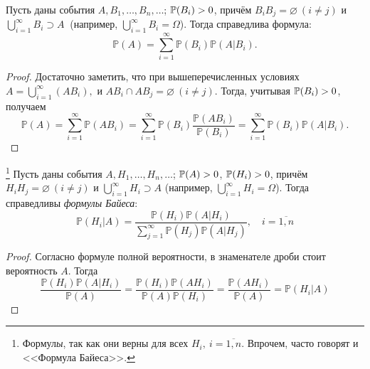 \begin{namedthm}
    Пусть даны события $A, B_1, \ldots, B_n, \ldots$; ${\mathbb{P}(B_i)} > 0$, причём $B_i B_j = \varnothing~(i \neq j)$ и $\bigcup\limits_{i=1}^{\infty}B_i \supset A~$ (например, $\bigcup\limits_{i=1}^{\infty}B_i = \Omega$). 
    Тогда справедлива формула:
    \begin{equation*}
        \mathbb{P}(A)=\sum\limits_{i=1}^{\infty} \mathbb{P}\left(B_{i}\right) \mathbb{P}\left(A | B_{i}\right).
    \end{equation*}
\end{namedthm}

\begin{proof}
    Достаточно заметить, что при вышеперечисленных условиях $A = \bigcup\limits_{i=1}^{\infty}(AB_i),$ и $AB_i \cap AB_j = \varnothing ~(i \neq j).$ 
    Тогда, учитывая ${\mathbb{P}(B_i)} > 0$, получаем
    \begin{equation*}
        \mathbb{P}(A)=\sum\limits_{i=1}^{\infty} \mathbb{P}\left(A B_{i}\right)=\sum\limits_{i=1}^{\infty} \mathbb{P}\left(B_{i}\right) \frac{\mathbb{P}\left(A B_{i}\right)}{\mathbb{P}\left(B_{i}\right)}=\sum\limits_{i=1}^{\infty} \mathbb{P}\left(B_{i}\right) \mathbb{P}\left(A | B_{i}\right).
    \end{equation*}
\end{proof}

\begin{namedthm}\footnote{Формул\textit{ы}, так как они верны для всех $H_i, \: i = \overline{1, n}$. Впрочем, часто говорят и <<Формула Байеса>>.}
    Пусть даны события $A, H_1, \ldots, H_n, \ldots$; ${{\mathbb{P}(A)} > 0}$, ${{\mathbb{P}(H_i)} > 0}$, причём $H_i H_j = \varnothing ~(i \neq j)$ и $\bigcup\limits_{i=1}^\infty H_i \supset A$ (например, $\bigcup\limits_{i=1}^{\infty}H_i = \Omega$). Тогда справедливы \textit{формулы Байеса}:
    \begin{equation*}
        \mathbb{P}\left(H_{i} | A\right)= \frac{\mathbb{P}\left(H_{i}\right) \mathbb{P}\left(A | H_{i}\right)}{\sum\limits_{j=1}^{\infty} \mathbb{P}\left(H_{j}\right) \mathbb{P}\left(A | H_{j}\right)}, \quad i = \overline{1,n}
    \end{equation*}
\end{namedthm}
\begin{proof}
    Согласно формуле полной вероятности, в знаменателе дроби стоит вероятность $A$. 
    Тогда
    \begin{equation*}
        \frac{\mathbb{P}\left(H_{i}\right) \mathbb{P}\left(A | H_{i}\right)}{\mathbb{P}(A)}=\frac{\mathbb{P}\left(H_{i}\right) \mathbb{P}\left(A H_{i}\right)}{\mathbb{P}(A) \mathbb{P}\left(H_{i}\right)}=\frac{\mathbb{P}\left(A H_{i}\right)}{\mathbb{P}(A)}=\mathbb{P}\left(H_{i} | A\right) 
    \end{equation*}
\end{proof}

